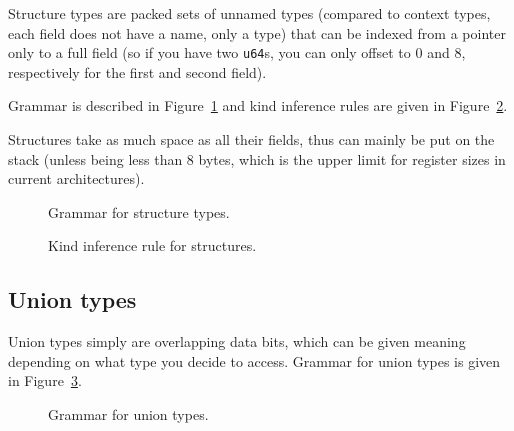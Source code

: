 Structure types are packed sets of unnamed types (compared to context types, each field does not have a name, only a type) that can be indexed from a pointer only to a full field (so if you have two \texttt{u64}s, you can only offset to $0$ and $8$, respectively for the first and second field).

Grammar is described in Figure~\ref{fig:nstar-common-ts-structs-syntax} and kind inference rules are given in Figure~\ref{fig:nstar-common-ts-structs-kindrules}.

Structures take as much space as all their fields, thus can mainly be put on the stack (unless being less than 8 bytes, which is the upper limit for register sizes in current architectures).

\begin{figure}[htb]
	\centering


	\caption{Grammar for structure types.}
	\label{fig:nstar-common-ts-structs-syntax}
\end{figure}

\begin{figure}[H]
	\centering


	\caption{Kind inference rule for structures.}
	\label{fig:nstar-common-ts-structs-kindrules}
\end{figure}

\subsection{Union types}\label{subsec:nstar-common-ts-unions}

Union types simply are overlapping data bits, which can be given meaning depending on what type you decide to access.
Grammar for union types is given in Figure~\ref{fig:nstar-common-ts-unions-syntax}.

\begin{figure}[htb]
	\centering


	\caption{Grammar for union types.}
	\label{fig:nstar-common-ts-unions-syntax}
\end{figure}

